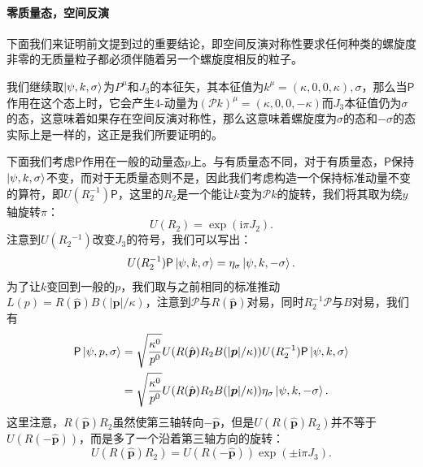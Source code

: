 \paragraph{零质量态，空间反演}
下面我们来证明前文提到过的重要结论，即空间反演对称性要求任何种类的螺旋度非零的无质量粒子都必须伴随着另一个螺旋度相反的粒子。

我们继续取$ \ket{\psi ,k,\sigma }$为$ P^{\mu }$和$ J_{3}$的本征矢，其本征值为$ k^{\mu } =( \kappa ,0,0,\kappa ) ,\sigma $，那么当$ \mathsf{P}$作用在这个态上时，它会产生4-动量为$ (\mathscr{P} k)^{\mu } =( \kappa ,0,0,-\kappa )$而$ J_{3}$本征值仍为$ \sigma $的态，这意味着如果存在空间反演对称性，那么这意味着螺旋度为$ \sigma $的态和$ -\sigma $的态实际上是一样的，这正是我们所要证明的。

下面我们考虑$ \mathsf{P}$作用在一般的动量态$ p$上。与有质量态不同，对于有质量态，$ \mathsf{P}$保持$ \ket{\psi ,k,\sigma }$不变，而对于无质量态则不是，因此我们考虑构造一个保持标准动量不变的算符，即$ U(R_{2}^{-1} )\mathsf{P}$，这里的$ R_{2}$是一个能让$ k$变为$ \mathscr{P} k$的旋转，我们将其取为绕$ y$轴旋转$ \pi $：
\begin{equation*}
	U( R_{2}) =\exp(\mathrm{i} \pi J_{2}) .
\end{equation*}
注意到$ U(R{_{2}}^{-1} )$改变$ J_{3}$的符号，我们可以写出：
\begin{equation*}
	U(R_{2}^{-1} )\mathsf{P}\ket{\psi ,k,\sigma } =\eta _{\sigma }\ket{\psi ,k,-\sigma } .
\end{equation*}
为了让$ k$变回到一般的$ p$，我们取与之前相同的标准推动$ L( p) =R(\hat{\boldsymbol{p}}) B(| \boldsymbol{p}| /\kappa )$，注意到$ \mathscr{P}$与$ R(\hat{\boldsymbol{p}})$对易，同时$ R_{2}^{-1}\mathscr{P}$与$ B$对易，我们有
\begin{equation*}
	\begin{aligned}
		\mathsf{P}\ket{\psi ,p,\sigma } & =\sqrt{\frac{\kappa ^{0}}{p^{0}}} U( R(\hat{\boldsymbol{p}}) R_{2} B(| \boldsymbol{p}| /\kappa )) U(R_{2}^{-1} )\mathsf{P}\ket{\psi ,k,\sigma }\\
		& =\sqrt{\frac{\kappa ^{0}}{p^{0}}} U( R(\hat{\boldsymbol{p}}) R_{2} B(| \boldsymbol{p}| /\kappa )) \eta _{\sigma }\ket{\psi ,k,-\sigma } .
	\end{aligned}
\end{equation*}
这里注意，$ R(\hat{\boldsymbol{p}}) R_{2}$虽然使第三轴转向$ -\hat{\boldsymbol{p}}$，但是$ U( R(\hat{\boldsymbol{p}}) R_{2})$并不等于$ U( R( -\hat{\boldsymbol{p}}))$，而是多了一个沿着第三轴方向的旋转：
\begin{equation*}
	U( R(\hat{\boldsymbol{p}}) R_{2}) =U( R( -\hat{\boldsymbol{p}}))\exp( \pm \mathrm{i} \pi J_{3}) .
\end{equation*}
